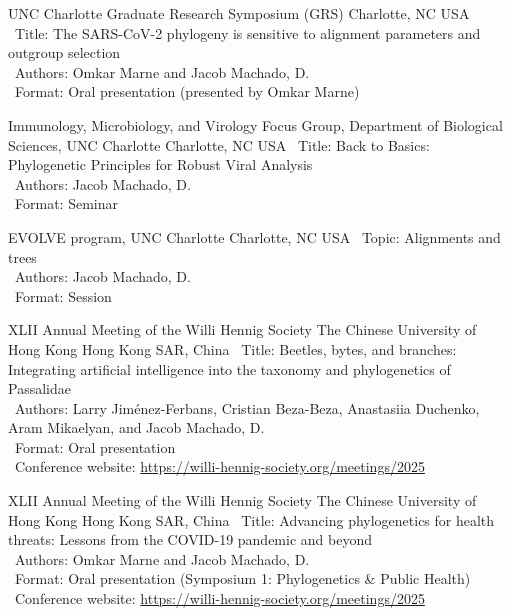 \documentclass[11pt, letterpaper, sans]{moderncv}
\begin{document}
    {UNC Charlotte Graduate Research Symposium (GRS)}
    {Charlotte, NC}
    {USA}
    {}
    {
        \textbullet~Title: The SARS-CoV-2 phylogeny is sensitive to alignment parameters and outgroup selection\\
        \textbullet~Authors: Omkar Marne and Jacob Machado, D.\\
        \textbullet~Format: Oral presentation (presented by Omkar Marne)
    }

    {Immunology, Microbiology, and Virology Focus Group, Department of Biological Sciences, UNC Charlotte}
    {Charlotte, NC}
    {USA}
    {}
    {
        \textbullet~Title: Back to Basics: Phylogenetic Principles for Robust Viral Analysis\\
        \textbullet~Authors: Jacob Machado, D.\\
        \textbullet~Format: Seminar
    }

    {EVOLVE program, UNC Charlotte}
    {Charlotte, NC}
    {USA}
    {}
    {
        \textbullet~Topic: Alignments and trees\\
        \textbullet~Authors: Jacob Machado, D.\\
        \textbullet~Format: Session
    }

    {XLII Annual Meeting of the Willi Hennig Society}
    {The Chinese University of Hong Kong}
    {Hong Kong SAR, China}
    {}
    {
        \textbullet~Title: Beetles, bytes, and branches: Integrating artificial intelligence into the taxonomy and phylogenetics of Passalidae\\
        \textbullet~Authors: Larry Jiménez-Ferbans, Cristian Beza-Beza, Anastasiia Duchenko, Aram Mikaelyan, and Jacob Machado, D.\\
        \textbullet~Format: Oral presentation\\
        \textbullet~Conference website: \url{https://willi-hennig-society.org/meetings/2025}
    }

    {XLII Annual Meeting of the Willi Hennig Society}
    {The Chinese University of Hong Kong}
    {Hong Kong SAR, China}
    {}
    {
        \textbullet~Title: Advancing phylogenetics for health threats: Lessons from the COVID-19 pandemic and beyond\\
        \textbullet~Authors: Omkar Marne and Jacob Machado, D.\\
        \textbullet~Format: Oral presentation (Symposium 1: Phylogenetics \& Public Health)\\
        \textbullet~Conference website: \url{https://willi-hennig-society.org/meetings/2025}
    }
\end{document}
